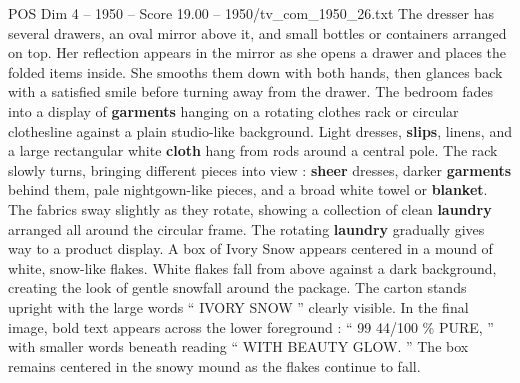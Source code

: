 \begin{textsample}{POS Dim 4 – 1950 – Score 19.00 – 1950/tv\_com\_1950\_26.txt}
The dresser has several drawers, an oval mirror above it, and small bottles or containers arranged on top.
Her reflection appears in the mirror as she opens a drawer and places the folded items inside.
She smooths them down with both hands, then glances back with a satisfied smile before turning away from the drawer.
The bedroom fades into a display of \textbf{garments} hanging on a rotating clothes rack or circular clothesline against a plain studio-like background.
Light dresses, \textbf{slips}, linens, and a large rectangular white \textbf{cloth} hang from rods around a central pole.
The rack slowly turns, bringing different pieces into view : \textbf{sheer} dresses, darker \textbf{garments} behind them, pale nightgown-like pieces, and a broad white towel or \textbf{blanket}.
The fabrics sway slightly as they rotate, showing a collection of clean \textbf{laundry} arranged all around the circular frame.
The rotating \textbf{laundry} gradually gives way to a product display.
A box of Ivory Snow appears centered in a mound of white, snow-like flakes.
White flakes fall from above against a dark background, creating the look of gentle snowfall around the package.
The carton stands upright with the large words “ IVORY SNOW ” clearly visible.
In the final image, bold text appears across the lower foreground : “ 99 44/100 \% PURE, ” with smaller words beneath reading “ WITH BEAUTY GLOW. ” The box remains centered in the snowy mound as the flakes continue to fall.

\end{textsample}
